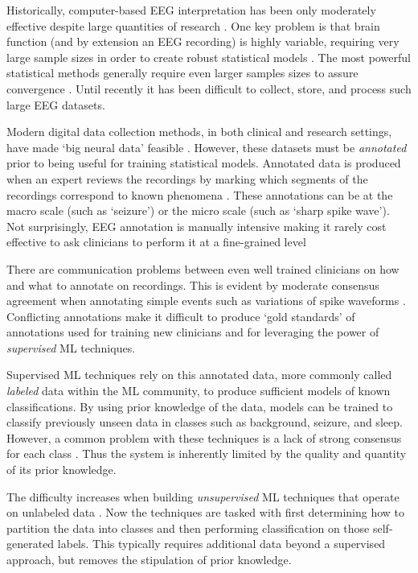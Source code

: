 Historically, computer-based \ac{EEG} interpretation has been only moderately effective despite large quantities of research \cite{Wulsin2011,Vidaurre2011b}. One key problem is that brain function (and by extension an \ac{EEG} recording) is highly variable, requiring very large sample sizes in order to create robust statistical models \cite{Stober2015}. The most powerful statistical methods generally require even larger samples sizes to assure convergence \cite{Izenman2008}. Until recently it has been difficult to collect, store, and process such large \ac{EEG} datasets.

Modern digital data collection methods, in both clinical and research settings, have made `big neural data' feasible \cite{Obeid2016a}. However, these datasets must be \emph{annotated} prior to being useful for training statistical models. Annotated data is produced when an expert reviews the recordings by marking which segments of the recordings correspond to known phenomena \cite{Kaplan2013}. These annotations can be at the macro scale (such as `seizure') or the micro scale (such as `sharp spike wave'). Not surprisingly, \ac{EEG} annotation is manually intensive making it rarely cost effective to ask clinicians to perform it at a fine-grained level \cite{Tsiouris2015}


There are communication problems between even well trained clinicians on how and what to annotate on recordings. This is evident by moderate consensus agreement when annotating simple events such as variations of spike waveforms \cite{Grant2014,Gaspard2014,Halford2015,Warby2014}. Conflicting annotations make it difficult to produce `gold standards' of annotations used for training new clinicians and for leveraging the power of \emph{supervised} \ac{ML} techniques.

Supervised \ac{ML} techniques rely on this annotated data, more commonly called \emph{labeled} data within the \ac{ML} community, to produce sufficient models of known classifications. By using prior knowledge of the data, models can be trained to classify previously unseen data in classes such as background, seizure, and sleep. However, a common problem with these techniques is a lack of strong consensus for each class \cite{Ramgopal2014}. Thus the system is inherently limited by the quality and quantity of its prior knowledge.

The difficulty increases when building \emph{unsupervised} \ac{ML} techniques that operate on unlabeled data \cite{Tsiouris2015,Ghosh-Dastidar2007}. Now the techniques are tasked with first determining how to partition the data into classes and then performing classification on those self-generated labels. This typically requires additional data beyond a supervised approach, but removes the stipulation of prior knowledge.

